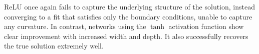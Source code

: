 ReLU once again fails to capture the underlying structure of the solution, instead converging to a 
fit that satisfies only the boundary conditions, unable to capture any curvature. In contrast, 
networks using the 
\(\tanh\) activation function show clear improvement with increased width and depth. 
It also successfully recovers the true solution extremely well.
